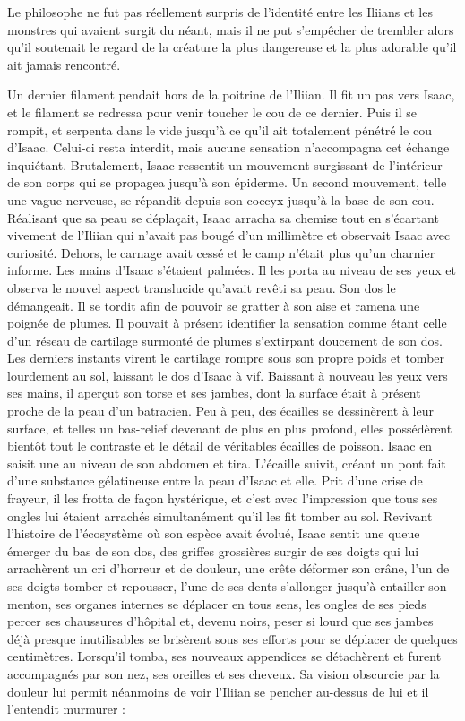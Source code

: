 \documentclass[12pt]{book}
\begin{document}
Le philosophe ne fut pas réellement surpris de l'identité entre les Iliians et les monstres qui avaient surgit du néant, mais il ne put s'empêcher de trembler alors qu'il soutenait le regard de la créature la plus dangereuse et la plus adorable qu'il ait jamais rencontré.


Un dernier filament pendait hors de la poitrine de l'Iliian. Il fit un pas vers Isaac, et le filament se redressa pour venir toucher le cou de ce dernier. Puis il se rompit, et serpenta dans le vide jusqu'à ce qu'il ait totalement pénétré le cou d'Isaac. Celui-ci resta interdit, mais aucune sensation n'accompagna cet échange inquiétant. Brutalement, Isaac ressentit un mouvement surgissant de l'intérieur de son corps qui se propagea jusqu'à son épiderme. Un second mouvement, telle une vague nerveuse, se répandit depuis son coccyx jusqu'à la base de son cou. Réalisant que sa peau se déplaçait, Isaac arracha sa chemise tout en s'écartant vivement de l'Iliian qui n'avait pas bougé d'un millimètre et observait Isaac avec curiosité. Dehors, le carnage avait cessé et le camp n'était plus qu'un charnier informe. Les mains d'Isaac s'étaient palmées. Il les porta au niveau de ses yeux et observa le nouvel aspect translucide qu'avait revêti sa peau. Son dos le démangeait. Il se tordit afin de pouvoir se gratter à son aise et ramena une poignée de plumes. Il pouvait à présent identifier la sensation comme étant celle d'un réseau de cartilage surmonté de plumes s'extirpant doucement de son dos. Les derniers instants virent le cartilage rompre sous son propre poids et tomber lourdement au sol, laissant le dos d'Isaac à vif. Baissant à nouveau les yeux vers ses mains, il aperçut son torse et ses jambes, dont la surface était à présent proche de la peau d'un batracien. Peu à peu, des écailles se dessinèrent à leur surface, et telles un bas-relief devenant de plus en plus profond, elles possédèrent bientôt tout le contraste et le détail de véritables écailles de poisson. Isaac en saisit une au niveau de son abdomen et tira. L'écaille suivit, créant un pont fait d'une substance gélatineuse entre la peau d'Isaac et elle. Prit d'une crise de frayeur, il les frotta de façon hystérique, et c'est avec l'impression que tous ses ongles lui étaient arrachés simultanément qu'il les fit tomber au sol. Revivant l'histoire de l'écosystème où son espèce avait évolué, Isaac sentit une queue émerger du bas de son dos, des griffes grossières surgir de ses doigts qui lui arrachèrent un cri d'horreur et de douleur, une crête déformer son crâne, l'un de ses doigts tomber et repousser, l'une de ses dents s'allonger jusqu'à entailler son menton, ses organes internes se déplacer en tous sens, les ongles de ses pieds percer ses chaussures d'hôpital et, devenu noirs, peser si lourd que ses jambes déjà presque inutilisables se brisèrent sous ses efforts pour se déplacer de quelques centimètres. Lorsqu'il tomba, ses nouveaux appendices se détachèrent et furent accompagnés par son nez, ses oreilles et ses cheveux. Sa vision obscurcie par la douleur lui permit néanmoins de voir l'Iliian se pencher au-dessus de lui et il l'entendit murmurer :
\end{document}
